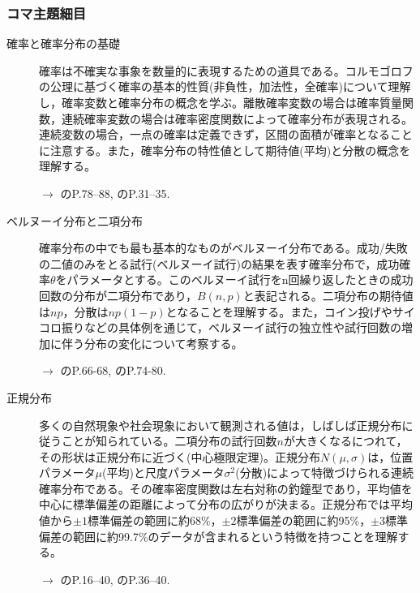 \subsubsection{コマ主題細目}
\begin{description}
	\item[確率と確率分布の基礎] 確率は不確実な事象を数量的に表現するための道具である。コルモゴロフの公理に基づく確率の基本的性質(非負性，加法性，全確率)について理解し，確率変数と確率分布の概念を学ぶ。離散確率変数の場合は確率質量関数，連続確率変数の場合は確率密度関数によって確率分布が表現される。連続変数の場合，一点の確率は定義できず，区間の面積が確率となることに注意する。また，確率分布の特性値として期待値(平均)と分散の概念を理解する。
	      \begin{flushright}
		      $\to$ \textcite{Maeda2017}のP.78--88, \textcite{Kawabata201408}のP.31--35.
	      \end{flushright}

	\item[ベルヌーイ分布と二項分布] 確率分布の中でも最も基本的なものがベルヌーイ分布である。成功/失敗の二値のみをとる試行(ベルヌーイ試行)の結果を表す確率分布で，成功確率$\theta$をパラメータとする。このベルヌーイ試行をn回繰り返したときの成功回数の分布が二項分布であり，$B(n,p)$と表記される。二項分布の期待値は$np$，分散は$np(1-p)$となることを理解する。また，コイン投げやサイコロ振りなどの具体例を通じて，ベルヌーイ試行の独立性や試行回数の増加に伴う分布の変化について考察する。
	      \begin{flushright}
		      $\to$ \textcite{Nojima201903}のP.66-68, \textcite{Yamada2004}のP.74-80.
	      \end{flushright}

	\item[正規分布] 多くの自然現象や社会現象において観測される値は，しばしば正規分布に従うことが知られている。二項分布の試行回数$n$が大きくなるにつれて，その形状は正規分布に近づく(中心極限定理)。正規分布$N(\mu,\sigma)$は，位置パラメータ$\mu$(平均)と尺度パラメータ$\sigma^2$(分散)によって特徴づけられる連続確率分布である。その確率密度関数は左右対称の釣鐘型であり，平均値を中心に標準偏差の距離によって分布の広がりが決まる。正規分布では平均値から$\pm 1$標準偏差の範囲に約68\%，$\pm 2$標準偏差の範囲に約95\%，$\pm 3$標準偏差の範囲に約99.7\%のデータが含まれるという特徴を持つことを理解する。
	      \begin{flushright}
		      $\to$ \textcite{Naganuma2201611}のP.16--40, \textcite{Kawabata201408}のP.36--40.
	      \end{flushright}


\end{description}
